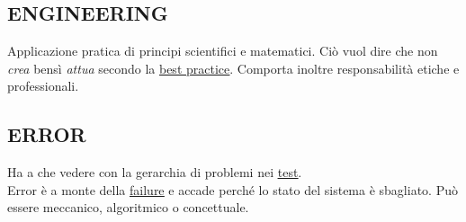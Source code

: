 		\subsection{ENGINEERING}  \label{engineering}
		Applicazione pratica di principi scientifici e matematici. Ciò vuol dire che non \textit{crea} bensì \textit{attua} secondo la \underline{\hyperref[best]{best practice}}. Comporta inoltre responsabilità etiche e professionali.

		\subsection{ERROR}		\label{error}
		Ha a che vedere con la gerarchia di problemi nei \underline{\hyperref[test]{test}}. \\
		Error è a monte della \underline{\hyperref[failure]{failure}} e accade perché lo stato del sistema è sbagliato. Può essere meccanico, algoritmico o concettuale.
